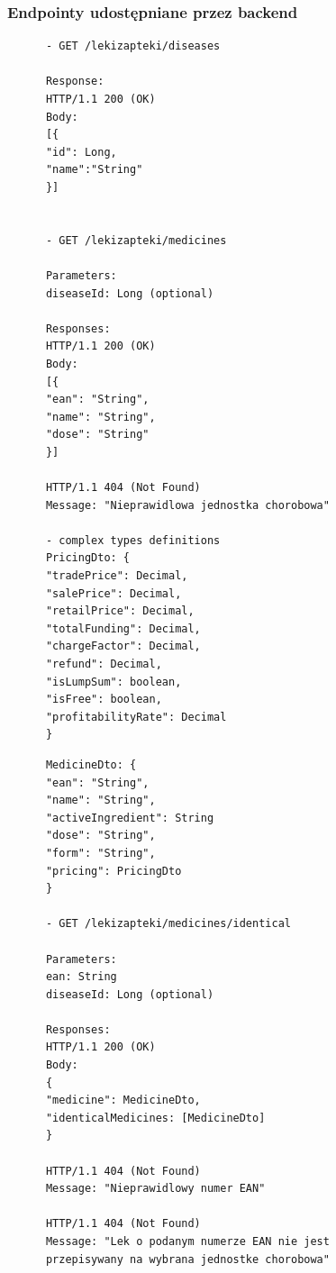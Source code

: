 \documentclass{article}
\begin{document}
  \subsubsection{Endpointy udostępniane przez backend}
  \noindent
  \begin{minipage}{.45\textwidth}
    \begin{lstlisting}
      - GET /lekizapteki/diseases

      Response:
      HTTP/1.1 200 (OK)
      Body:
      [{
      "id": Long,
      "name":"String"
      }]


      - GET /lekizapteki/medicines

      Parameters:
      diseaseId: Long (optional)

      Responses:
      HTTP/1.1 200 (OK)
      Body:
      [{
      "ean": "String",
      "name": "String",
      "dose": "String"
      }]

      HTTP/1.1 404 (Not Found)
      Message: "Nieprawidlowa jednostka chorobowa"

      - complex types definitions
      PricingDto: {
      "tradePrice": Decimal,
      "salePrice": Decimal,
      "retailPrice": Decimal,
      "totalFunding": Decimal,
      "chargeFactor": Decimal,
      "refund": Decimal,
      "isLumpSum": boolean,
      "isFree": boolean,
      "profitabilityRate": Decimal
      }

    \end{lstlisting}
  \end{minipage}\hfill
  \begin{minipage}{.45\textwidth}
    \begin{lstlisting}
      MedicineDto: {
      "ean": "String",
      "name": "String",
      "activeIngredient": String
      "dose": "String",
      "form": "String",
      "pricing": PricingDto
      }

      - GET /lekizapteki/medicines/identical

      Parameters:
      ean: String
      diseaseId: Long (optional)

      Responses:
      HTTP/1.1 200 (OK)
      Body:
      {
      "medicine": MedicineDto,
      "identicalMedicines: [MedicineDto]
      }

      HTTP/1.1 404 (Not Found)
      Message: "Nieprawidlowy numer EAN"

      HTTP/1.1 404 (Not Found)
      Message: "Lek o podanym numerze EAN nie jest
      przepisywany na wybrana jednostke chorobowa"
    \end{lstlisting}
  \end{minipage}
\end{document}
